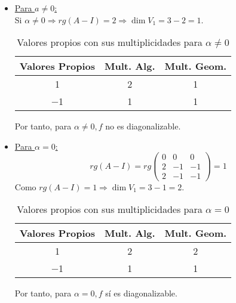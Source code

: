 \begin{ejercicio}
\begin{enumerate}
        \begin{itemize}
            \item \underline{Para $a\neq 0$:}\\
            Si $\alpha\neq 0\Longrightarrow rg(A-I)=2 \Longrightarrow \dim V_1 = 3-2 = 1$.
            \begin{table}[H]
                \centering
                \begin{tabular}{c|c|c}
                    Valores Propios & Mult. Alg. & Mult. Geom. \\ \hline 
                    1 & 2 & 1\\
                    $-$1 & 1 & 1\\
                \end{tabular}
                \caption{Valores propios con sus multiplicidades para $\alpha\neq 0$}
            \end{table}
            Por tanto, para $\alpha\neq 0, f$ no es diagonalizable.

            \item \underline{Para $\alpha=0$:}\\
            \begin{equation*}
                rg(A-I) = rg\left(\begin{array}{ccc}
                    0 & 0 & 0 \\
                    2 & -1 & -1 \\
                    2 & -1 & -1
                \end{array} \right) = 1
            \end{equation*}
            Como $rg(A-I)=1 \Longrightarrow \dim V_1 = 3-1 = 2$.
            \begin{table}[H]
                \centering
                \begin{tabular}{c|c|c}
                    Valores Propios & Mult. Alg. & Mult. Geom. \\ \hline 
                    1 & 2 & 2\\
                    $-$1 & 1 & 1\\
                \end{tabular}
                \caption{Valores propios con sus multiplicidades para $\alpha= 0$}
            \end{table}
            Por tanto, para $\alpha= 0, f$ sí es diagonalizable.
        \end{itemize}
        

\end{enumerate}
\end{ejercicio}
